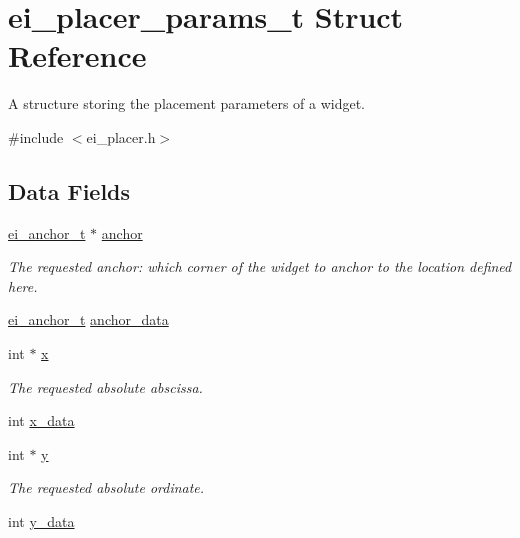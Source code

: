 \hypertarget{structei__placer__params__t}{\section{ei\-\_\-placer\-\_\-params\-\_\-t Struct Reference}
\label{structei__placer__params__t}
}


A structure storing the placement parameters of a widget.  




{\ttfamily \#include $<$ei\-\_\-placer.\-h$>$}

\subsection*{Data Fields}
\begin{DoxyCompactItemize}
\item 
\hyperlink{ei__types_8h_a3852c963af609d31d7cfcff79c4c8450}{ei\-\_\-anchor\-\_\-t} $\ast$ \hyperlink{structei__placer__params__t_ada4443b28a68ad51ab28667dbe23902c}{anchor}
\begin{DoxyCompactList}\small\item\em The requested anchor\-: which corner of the widget to anchor to the location defined here. \end{DoxyCompactList}\item 
\hyperlink{ei__types_8h_a3852c963af609d31d7cfcff79c4c8450}{ei\-\_\-anchor\-\_\-t} \hyperlink{structei__placer__params__t_a8351a31ff125a983c8640c93699309dd}{anchor\-\_\-data}
\item 
int $\ast$ \hyperlink{structei__placer__params__t_ae8562a49f17673cd02409d34fdc81154}{x}
\begin{DoxyCompactList}\small\item\em The requested absolute abscissa. \end{DoxyCompactList}\item 
int \hyperlink{structei__placer__params__t_ae6078f805f079c2ac6e54ecfbe321c50}{x\-\_\-data}
\item 
int $\ast$ \hyperlink{structei__placer__params__t_a1a59b5414bc00a277b71d84adab2ceae}{y}
\begin{DoxyCompactList}\small\item\em The requested absolute ordinate. \end{DoxyCompactList}\item 
int \hyperlink{structei__placer__params__t_afa297c58c25de969e3aaf5c01456b04f}{y\-\_\-data}
\item 

\end{DoxyCompactItemize}

